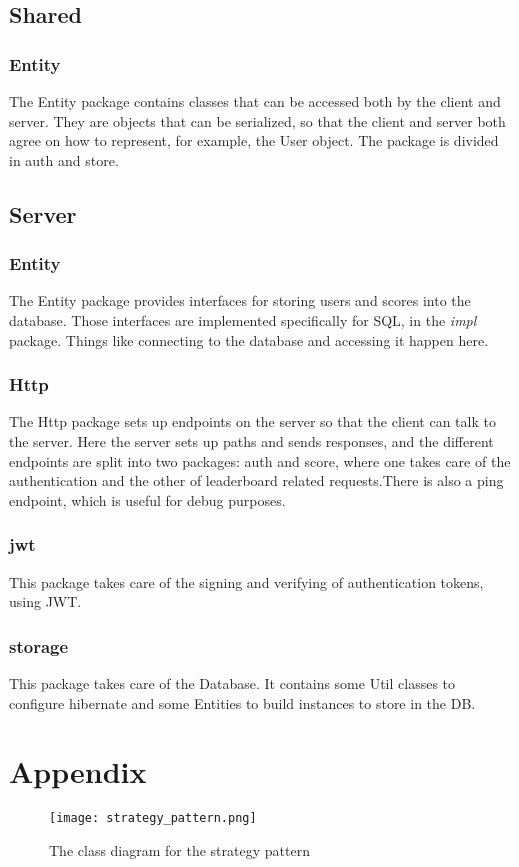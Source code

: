 \documentclass{article}
\begin{document}
\subsection{Shared}
\subsubsection{Entity}
The Entity package contains classes that can be accessed both by the client and server. They are objects that can be serialized, so that the client and server both agree on how to represent, for example, the User object. 
The package is divided in auth and store.
\subsection{Server}
\subsubsection{Entity}
The Entity package provides interfaces for storing users and scores into the database. Those interfaces are implemented specifically for SQL, in the {\it impl} package. Things like connecting to the database and accessing it happen here.
\subsubsection{Http}
The Http package sets up endpoints on the server so that the client can talk to the server. Here the server sets up paths and sends responses, and the different endpoints are split into two packages: auth and score, where one takes care of the authentication and the other of leaderboard related requests.There is also a ping endpoint, which is useful for debug purposes.

\subsubsection{jwt}
This package takes care of the signing and verifying of authentication tokens, using JWT.
\subsubsection{storage}
This package takes care of the Database. It contains some Util classes to configure hibernate and some Entities to build instances to store in the DB.

\section{Appendix}
\begin{figure}
    \centering
    \texttt{[image: strategy\_pattern.png]}
    \caption{The class diagram for the strategy pattern}
    \label{fig:strategy_dp}
\end{figure}
\end{document}
